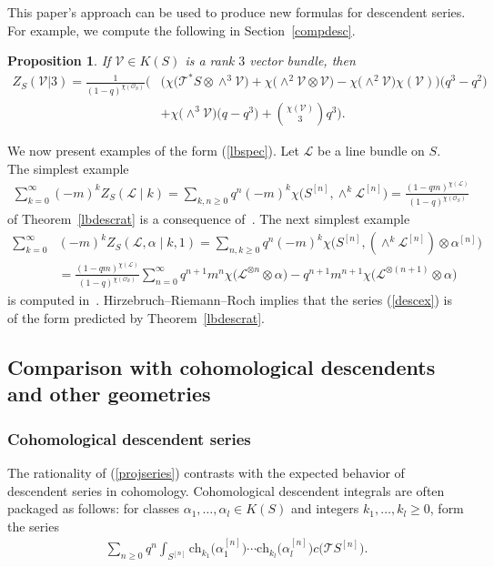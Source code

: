 \documentclass[10pt,a4paper]{amsart}
\newtheorem{Proposition}[Theorem]{Proposition}
 { \theoremstyle{definition}
\newtheorem{Definition}[Theorem]{Definition}
\newtheorem{Note}[Theorem]{Note}
\newtheorem{Example}[Theorem]{Example}
\newtheorem{Remark}[Theorem]{Remark} }
\numberwithin{equation}{section}
\newcommand{\ch}{\mathrm{ch}}
\begin{document}
This paper's approach can be used to produce new formulas for descendent series. For example, we compute the following in Section~\ref{compdesc}.
\begin{Proposition} \label{newdesc}
If $\mathcal{V}\in K(S)$ is a rank $3$ vector bundle, then
\begin{align*}
Z_{S}(\mathcal{V}|3) = \frac{1}{(1-q)^{\chi(\mathcal{O}_S)}} \bigg(&\big(\chi\big(\mathcal{T}^{*}S\otimes \wedge^3 \mathcal{V}\big)+\chi\big({\wedge}^2\mathcal{V}\otimes \mathcal{V}\big)-\chi\big({\wedge}^2\mathcal{V}\big)\chi( \mathcal{V})\big)\big(q^3-q^2\big)
\\
&+\chi\big({\wedge}^3\mathcal{V}\big)\big(q-q^3\big)+\binom{\chi(\mathcal{V})}{3} q^3\bigg).
\end{align*}
\end{Proposition}


We now present examples of the form (\ref{lbspec}). Let $\mathcal{L}$ be a line bundle on $S$. The simplest example
\begin{gather*}
\sum_{k=0}^{\infty} (-m)^kZ_{S}(\mathcal{L}\mid k)
=\sum_{k,n\geq 0} q^n(-m)^k\chi\big(S^{[n]},\wedge^{k}\mathcal{L}^{[n]}\big)
=\frac{(1-qm)^{\chi(\mathcal{L})}}{(1-q)^{\chi(\mathcal{O}_S)}}
\end{gather*}
of Theorem~\ref{lbdescrat} is a consequence of~\cite[Theorem~5.2.1]{Sc1}.
The next simplest example
{\samepage\begin{align}\label{descex}
\sum_{k=0}^{\infty} &(-m)^kZ_{S}(\mathcal{L},\alpha\mid k,1)= \sum_{n,k\geq 0} q^n(-m)^k \chi\big(S^{[n]},(\wedge^{k}\mathcal{L}^{[n]}) \otimes \alpha^{[n]}\big)\nonumber
\\
&=\frac{(1-qm)^{\chi(\mathcal{L})}}{(1-q)^{\mathcal{\chi(\mathcal{O}_S)}}} \sum_{n=0}^{\infty}q^{n+1}m^n\chi\big(\mathcal{L}^{\otimes n}\otimes \alpha\big)-q^{n+1}m^{n+1}\chi\big(\mathcal{L}^{\otimes (n+1)}\otimes \alpha\big)
\end{align}}%
is computed in~\cite[Proposition 20]{AJLOP}. Hirzebruch--Riemann--Roch implies that the series (\ref{descex}) is of the form predicted by Theorem~\ref{lbdescrat}.


\subsection{Comparison with cohomological descendents and other geometries}
\subsubsection{Cohomological descendent series}
The rationality of (\ref{projseries}) contrasts with the expected behavior of descendent series in cohomology. Cohomological descendent integrals are often packaged as follows: for classes $\alpha_1,\dots,\alpha_l\in K(S)$ and integers $k_1,\dots,k_l\geq 0$, form the series \begin{align}\label{cohseries}
\sum_{n\geq 0} q^n\int_{S^{[n]}} \ch_{k_1}\big(\alpha_1^{[n]}\big)\cdots \ch_{k_l}\big(\alpha_l^{[n]}\big) c\big(\mathcal{T}S^{[n]}\big).
\end{align}
\end{document}

